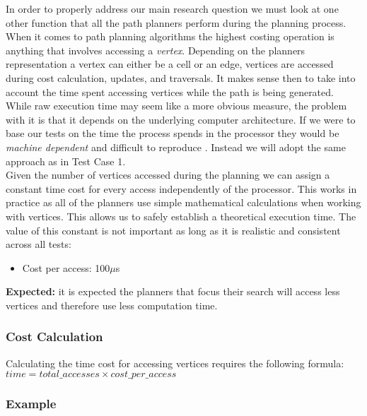 \noindent
In order to properly address our main research question we must look at one other function that all the path planners perform during the planning process. When it comes to path planning algorithms the highest costing operation is anything that involves accessing a \textit{vertex}. Depending on the planners representation a vertex can either be a cell or an edge, vertices are accessed during cost calculation, updates, and traversals. It makes sense then to take into account the time spent accessing vertices while the path is being generated. \\

\noindent
While raw execution time may seem like a more obvious measure, the problem with it is that it depends on the underlying computer architecture. If we were to base our tests on the time the process spends in the processor they would be \textit{machine dependent} and difficult to reproduce \cite{FIELD2}. Instead we will adopt the same approach as in Test Case 1. \\

\noindent
Given the number of vertices accessed during the planning we can assign a constant time cost for every access independently of the processor. This works in practice as all of the planners use simple mathematical calculations when working with vertices. This allows us to safely establish a theoretical execution time. The value of this constant is not important as long as it is realistic and consistent across all tests:

\begin{itemize}
\item Cost per access: 100$\mu$s
\end{itemize}   

\noindent
\textbf{Expected:} it is expected the planners that focus their search will access less vertices and therefore use less computation time.

\subsubsection{Cost Calculation}

\noindent
Calculating the time cost for accessing vertices requires the following formula: \\

\indent $time = total\_accesses \times cost\_per\_access$

\subsubsection{Example}

